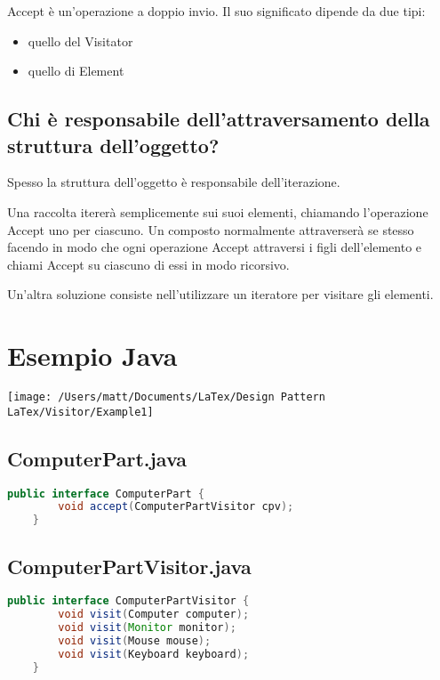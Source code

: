 Accept è un'operazione a doppio invio. Il suo significato dipende da due tipi:

\begin{itemize}
    \item quello del Visitator
    \item quello di Element
\end{itemize}

\subsection{Chi è responsabile dell'attraversamento della struttura dell'oggetto?}
Spesso la struttura dell'oggetto è responsabile dell'iterazione.

Una raccolta itererà semplicemente sui suoi elementi, chiamando l'operazione Accept uno per ciascuno. Un composto normalmente attraverserà se stesso facendo in modo che ogni operazione Accept attraversi i figli dell'elemento e chiami Accept su ciascuno di essi in modo ricorsivo.

Un'altra soluzione consiste nell'utilizzare un iteratore per visitare gli elementi.


\section{Esempio Java}
\texttt{[image: /Users/matt/Documents/LaTex/Design Pattern LaTex/Visitor/Example1]}

\subsection{ComputerPart.java}
\begin{lstlisting}[language=java]
    public interface ComputerPart {
        void accept(ComputerPartVisitor cpv);
    }
\end{lstlisting}

\subsection{ComputerPartVisitor.java}
\begin{lstlisting}[language=java]
    public interface ComputerPartVisitor {
        void visit(Computer computer);
        void visit(Monitor monitor);
        void visit(Mouse mouse);
        void visit(Keyboard keyboard);
    }
\end{lstlisting}

